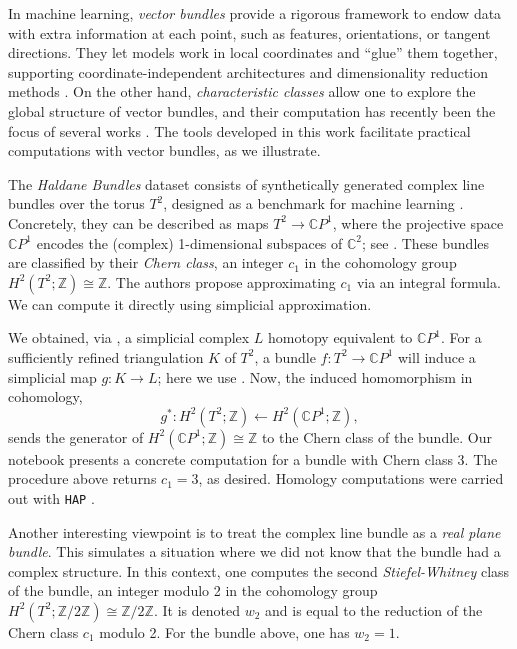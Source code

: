 \documentclass[a4paper,english,cleveref,autoref,thm-restate,nolineno]{socg-lipics-v2021}
\newcommand{\C}{\mathbb C}
\newcommand{\Z}{\mathbb Z}
\begin{document}
\begin{example}
	In machine learning, \textit{vector bundles} provide a rigorous framework to endow data with extra information at each point, such as features, orientations, or tangent directions.
	They let models work in local coordinates and ``glue'' them together, supporting coordinate-independent architectures \cite{cohen2019gauge,aronsson2022homogeneous} and dimensionality reduction methods \cite{singer2012vector,scoccola_et_al:LIPIcs.SoCG.2023.56}.
	On the other hand, \textit{characteristic classes} allow one to explore the global structure of vector bundles, and their computation has recently been the focus of several works \cite{tinarrage2022computing,scoccola2023approximate,gang2025persistentstiefelwhitneyclassestangent}.
	The tools developed in this work facilitate practical computations with vector bundles, as we illustrate.
	
	The \textit{Haldane Bundles} dataset consists of synthetically generated complex line bundles over the torus $T^2$, designed as a benchmark for machine learning \cite{pmlr-v228-tipton24a}.
	Concretely, they can be described as maps $T^2\to \C P^1$, where the projective space $\C P^1$ encodes the (complex) 1-dimensional subspaces of $\C^2$; see .
	These bundles are classified by their \textit{Chern class}, an integer $c_1$ in the cohomology group $H^2(T^2; \Z)\cong\Z$.
	The authors propose approximating $c_1$ via an integral formula. 
	We can compute it directly using simplicial approximation.
	
	We obtained, via , a simplicial complex $L$ homotopy equivalent to $ \C P^1$. 
	For a sufficiently refined triangulation $K$ of $T^2$, a bundle $f\colon T^2\to \C P^1$ will induce a simplicial map $g\colon K\to L$; here we use .
	Now, the induced homomorphism in cohomology,
	\[
	g^*\colon H^2(T^2; \Z) \leftarrow H^2(\C P^1; \Z),
	\]
	sends the generator of $H^2(\C P^1; \Z)\cong\Z$ to the Chern class of the bundle.
	Our notebook presents a concrete computation for a bundle with Chern class 3.
	The procedure above returns $c_1=3$, as desired.
	Homology computations were carried out with \texttt{HAP} \cite{Ellis2025}.
	
	Another interesting viewpoint is to treat the complex line bundle as a \textit{real plane bundle}.
	This simulates a situation where we did not know that the bundle had a complex structure.
	In this context, one computes the second \textit{Stiefel-Whitney} class of the bundle, an integer modulo 2 in the cohomology group $H^2(T^2; \Z/2\Z)\cong\Z/2\Z$.
	It is denoted $w_2$ and is equal to the reduction of the Chern class $c_1$ modulo 2.
	For the bundle above, one has $w_2=1$.
	

\end{example}
\end{document}
